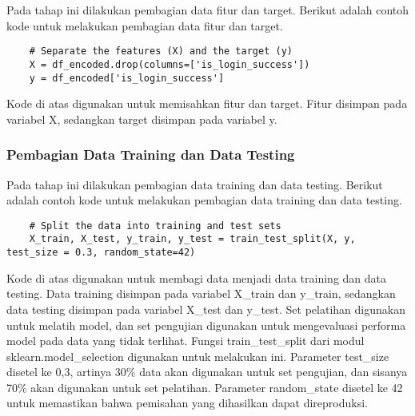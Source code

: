 Pada tahap ini dilakukan pembagian data fitur dan target. Berikut adalah contoh kode untuk melakukan pembagian data fitur dan target.
\begin{lstlisting}
    # Separate the features (X) and the target (y)
    X = df_encoded.drop(columns=['is_login_success'])
    y = df_encoded['is_login_success']
    \end{lstlisting}

    Kode di atas digunakan untuk memisahkan fitur dan target. Fitur disimpan pada variabel X, sedangkan target disimpan pada variabel y.

\subsubsection{Pembagian Data Training dan Data Testing}
Pada tahap ini dilakukan pembagian data training dan data testing. Berikut adalah contoh kode untuk melakukan pembagian data training dan data testing.
\begin{lstlisting}
    # Split the data into training and test sets
    X_train, X_test, y_train, y_test = train_test_split(X, y, test_size = 0.3, random_state=42)
\end{lstlisting}

    Kode di atas digunakan untuk membagi data menjadi data training dan data testing. Data training disimpan pada variabel X\_train dan y\_train, sedangkan data testing disimpan pada variabel X\_test dan y\_test.
    Set pelatihan digunakan untuk melatih model, dan set pengujian digunakan untuk mengevaluasi performa model pada data yang tidak terlihat. 
    Fungsi train\_test\_split dari modul sklearn.model\_selection digunakan untuk melakukan ini. Parameter test\_size disetel ke 0,3, artinya 30\% data akan digunakan untuk set pengujian, dan sisanya 70\% akan digunakan untuk set pelatihan. Parameter random\_state disetel ke 42 untuk memastikan bahwa pemisahan yang dihasilkan dapat direproduksi.
